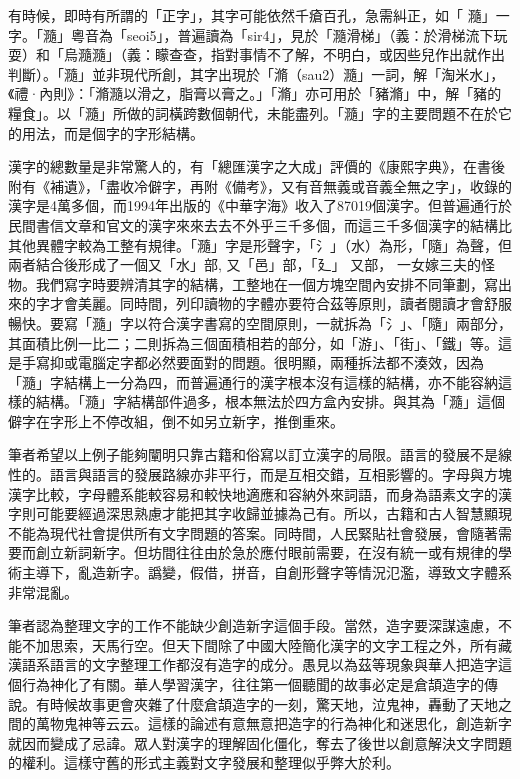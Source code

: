 \documentclass[a5paper, 10pt, openany]{book} %
\begin{document}
有時候，即時有所謂的「正字」，其字可能依然千瘡百孔，急需糾正，如「 瀡」一字。「瀡」粵音為「seoi5」，普遍讀為「sir4」，見於「瀡滑梯」（義：於滑梯流下玩耍）和「烏瀡瀡」（義：矇查查，指對事情不了解，不明白，或因些兒作出就作出判斷）。「瀡」並非現代所創，其字出現於「滫（sau2）瀡」一詞，解「淘米水」，《禮·內則》：「滫瀡以滑之，脂膏以膏之。」「滫」亦可用於「豬滫」中，解「豬的糧食」。以「瀡」所做的詞橫跨數個朝代，未能盡列。「瀡」字的主要問題不在於它的用法，而是個字的字形結構。

漢字的總數量是非常驚人的，有「總匯漢字之大成」評價的《康熙字典》，在書後附有《補遺》，「盡收冷僻字，再附《備考》，又有音無義或音義全無之字」，收錄的漢字是4萬多個，而1994年出版的《中華字海》收入了87019個漢字。但普遍通行於民間書信文章和官文的漢字來來去去不外乎三千多個，而這三千多個漢字的結構比其他異體字較為工整有規律。「瀡」字是形聲字，「氵」（水）為形，「隨」為聲，但兩者結合後形成了一個又「水」部, 又「邑」部，「廴」 又部， 一女嫁三夫的怪物。我們寫字時要辨清其字的結構，工整地在一個方塊空間內安排不同筆劃，寫出來的字才會美麗。同時間，列印讀物的字體亦要符合茲等原則，讀者閱讀才會舒服暢快。要寫「瀡」字以符合漢字書寫的空間原則，一就拆為「氵」、「隨」兩部分，其面積比例一比二；二則拆為三個面積相若的部分，如「游」、「街」、「鐵」等。這是手寫抑或電腦定字都必然要面對的問題。很明顯，兩種拆法都不湊效，因為「瀡」字結構上一分為四，而普遍通行的漢字根本沒有這樣的結構，亦不能容納這樣的結構。「瀡」字結構部件過多，根本無法於四方盒內安排。與其為「瀡」這個僻字在字形上不停改組，倒不如另立新字，推倒重來。

筆者希望以上例子能夠闡明只靠古籍和俗寫以訂立漢字的局限。語言的發展不是線性的。語言與語言的發展路線亦非平行，而是互相交錯，互相影響的。字母與方塊漢字比較，字母體系能較容易和較快地適應和容納外來詞語，而身為語素文字的漢字則可能要經過深思熟慮才能把其字收歸並據為己有。所以，古籍和古人智慧顯現不能為現代社會提供所有文字問題的答案。同時間，人民緊貼社會發展，會隨著需要而創立新詞新字。但坊間往往由於急於應付眼前需要，在沒有統一或有規律的學術主導下，亂造新字。譌變，假借，拼音，自創形聲字等情況氾濫，導致文字體系非常混亂。

筆者認為整理文字的工作不能缺少創造新字這個手段。當然，造字要深謀遠慮，不能不加思索，天馬行空。但天下間除了中國大陸簡化漢字的文字工程之外，所有藏漢語系語言的文字整理工作都沒有造字的成分。愚見以為茲等現象與華人把造字這個行為神化了有關。華人學習漢字，往往第一個聽聞的故事必定是倉頡造字的傳說。有時候故事更會夾雜了什麼倉頡造字的一刻，驚天地，泣鬼神，轟動了天地之間的萬物鬼神等云云。這樣的論述有意無意把造字的行為神化和迷思化，創造新字就因而變成了忌諱。眾人對漢字的理解固化僵化，奪去了後世以創意解決文字問題的權利。這樣守舊的形式主義對文字發展和整理似乎弊大於利。
\end{document}

